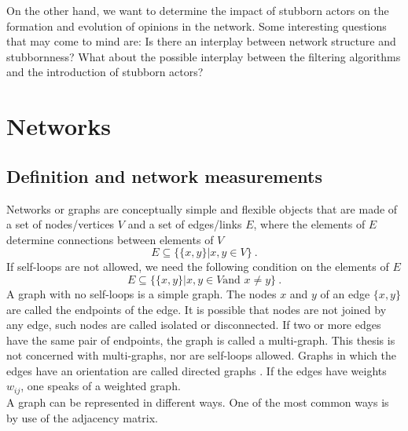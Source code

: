 \documentclass[11 pt , letterpaper , twoside , openright]{book}
\begin{document}
\newline
On the other hand, we want to determine the impact of stubborn actors on the formation and evolution of opinions in the network. Some interesting questions that may come to mind are: Is there an interplay between network structure and stubbornness? What about the possible interplay between the filtering algorithms and the introduction of stubborn actors?\\


\chapter{Networks}
\label{chap2}

\section{Definition and network measurements}
\label{netDef}

Networks or graphs are conceptually simple and flexible objects that are made of a set of nodes/vertices $V$ and a set of edges/links $E$, where the elements of $E$ determine connections between elements of $V$ \cite{Costa2018}
\begin{equation}
	E \subseteq \{\{x, y\}| x, y \in V \}\ .
\end{equation}
If self-loops are not allowed, we need the following condition on the elements of $E$
\begin{equation}
	E \subseteq \{\{x, y\}| x, y \in V \text{and\ } x \neq y \} \ .
\end{equation}
A graph with no self-loops is a simple graph. The nodes $x$ and $y$ of an edge $\{x, y\}$ are called the endpoints of the edge. It is possible that nodes are not joined by any edge, such nodes are called isolated or disconnected. If two or more edges have the same pair of endpoints, the graph is called a multi-graph. This thesis is not concerned with multi-graphs, nor are self-loops allowed. Graphs in which the edges have an orientation are called directed graphs \cite{Costa2018}. If the edges have weights $w_{ij}$, one speaks of a weighted graph.\\
\newline
A graph can be represented in different ways. One of the most common ways is by use of the adjacency matrix.
\end{document}
